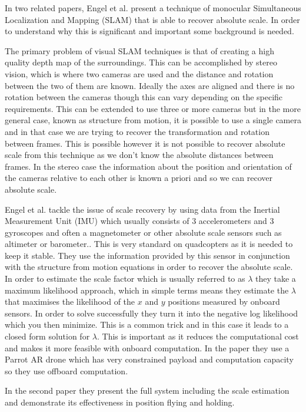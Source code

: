 \documentclass[]{../resources/final_report}
\begin{document}
In two related papers, Engel et al. present a technique of monocular Simultaneous Localization and Mapping (SLAM) that is able to recover absolute scale. In order to understand why this is significant and important some background is needed.

The primary problem of visual SLAM techniques is that of creating a high quality depth map of the surroundings. This can be accomplished by stereo vision, which is where two cameras are used and the distance and rotation between the two of them are known. Ideally the axes are aligned and there is no rotation between the cameras though this can vary depending on the specific requirements.
This can be extended to use three or more cameras but in the more general case, known as structure from motion, it is possible to use a single camera and in that case we are trying to recover the transformation and rotation between frames. This is possible however it is not possible to recover absolute scale from this technique as we don't know the absolute distances between frames. In the stereo case the information about the position and orientation of the cameras relative to each other is known a priori and so we can recover absolute scale.

Engel et al. tackle the issue of scale recovery by using data from the Inertial Measurement Unit (IMU) which usually consists of 3 accelerometers and 3 gyroscopes and often a magnetometer or other absolute scale sensors such as altimeter or barometer.. This is very standard on quadcopters as it is needed to keep it stable. They use the information provided by this sensor in conjunction with the structure from motion equations in order to recover the absolute scale. 
In order to estimate the scale factor which is usually referred to as $\lambda$ they take a maximum likelihood approach, which in simple terms means they estimate the $\lambda$ that maximises the likelihood of the $x$ and $y$ positions measured by onboard sensors. In order to solve successfully they turn it into the negative log likelihood which you then minimize. This is a common trick and in this case it leads to a closed form solution for $\lambda$. 
This is important as it reduces the computational cost and makes it more feasible with onboard computation. In the paper they use a Parrot AR drone which has very constrained payload and computation capacity so they use offboard computation.

In the second paper \cite{Engel:FigureFlying} they present the full system including the scale estimation and demonstrate its effectiveness in position flying and holding.
\end{document}
